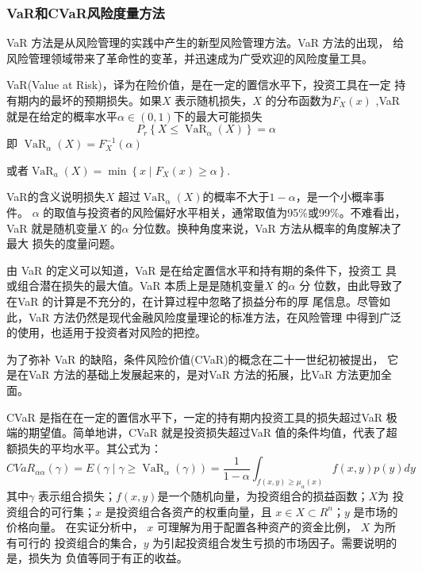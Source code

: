 \documentclass[withoutpreface,bwprint]{cumcmthesis} %
\begin{document}
	\subsubsection{VaR和CVaR风险度量方法}
	VaR 方法是从风险管理的实践中产生的新型风险管理方法。VaR 方法的出现，
	给风险管理领域带来了革命性的变革，并迅速成为广受欢迎的风险度量工具。
	
	VaR(Value at Risk)，译为在险价值，是在一定的置信水平下，投资工具在一定
	持有期内的最坏的预期损失。如果$X$ 表示随机损失，$X$ 的分布函数为$F_{X}(x)$ ,VaR
	就是在给定的概率水平$\alpha \in(0,1)$下的最大可能损失
$$
P_{r}\left\{X \leq \operatorname{VaR}_{\alpha}(X)\right\}=\alpha
$$
	即 $\operatorname{VaR}_{\alpha}(X)=F_{X}^{-1}(\alpha)$
	
	或者$\operatorname{VaR}_{a}(X)=\min \left\{x \mid F_{X}(x) \geq \alpha\right\}$.
	
	VaR的含义说明损失$X$ 超过$\operatorname{VaR}_{\alpha}(X)$的概率不大于$1-\alpha$，是一个小概率事件。
	$\alpha$ 的取值与投资者的风险偏好水平相关，通常取值为95\%或99\%。不难看出，VaR
	就是随机变量$X$ 的$\alpha$ 分位数。换种角度来说，VaR 方法从概率的角度解决了最大
	损失的度量问题。
	
	由 VaR 的定义可以知道，VaR 是在给定置信水平和持有期的条件下，投资工
	具或组合潜在损失的最大值。VaR 本质上是是随机变量$X$ 的$\alpha$ 分
	位数，由此导致了在VaR 的计算是不充分的，在计算过程中忽略了损益分布的厚
	尾信息。尽管如此，VaR 方法仍然是现代金融风险度量理论的标准方法，在风险管理
	中得到广泛的使用，也适用于投资者对风险的把控。
	
	为了弥补 VaR 的缺陷，条件风险价值(CVaR)的概念在二十一世纪初被提出，
	它是在VaR 方法的基础上发展起来的，是对VaR 方法的拓展，比VaR 方法更加全
	面。
	
	CVaR 是指在在一定的置信水平下，一定的持有期内投资工具的损失超过VaR
	极端的期望值。简单地讲，CVaR 就是投资损失超过VaR 值的条件均值，代表了超
	额损失的平均水平。其公式为：
	\begin{equation}
	C V a R_{\alpha \alpha}(\gamma)=E\left(\gamma \mid \gamma \geq \operatorname{VaR}_{\alpha}(\gamma)\right)=\frac{1}{1-\alpha} \int_{f(x, y) \geq \mu_{\alpha}(x)} f(x, y) p(y) d y
	\end{equation}
	其中$\gamma$ 表示组合损失；$f (x, y)$是一个随机向量，为投资组合的损益函数；$X $为
	投资组合的可行集；$x$ 是投资组合各资产的权重向量，且
	$x \in X \subset R^{n}$；$y$ 是市场的
	价格向量。
	在实证分析中， $x$ 可理解为用于配置各种资产的资金比例， $X$ 为所有可行的
	投资组合的集合，$y$ 为引起投资组合发生亏损的市场因子。需要说明的是，损失为
	负值等同于有正的收益。
	
\end{document}
